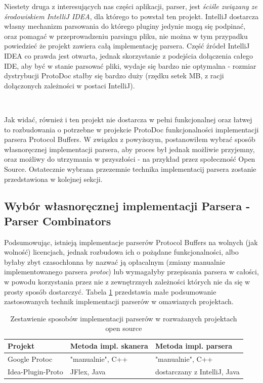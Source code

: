 \documentclass[pdflatex,11pt]{aghdpl}
\begin{document}
\newpage

Niestety druga z interesujących nas części aplikacji, parser, jest \textit{ściśle związany ze środowiskiem IntelliJ IDEA}, dla którego to powstał ten projekt.
IntelliJ dostarcza własny mechanizm parsowania do którego pluginy jedynie mogą się podpinać, oraz pomagać w przeprowadzeniu parsingu pliku, nie można w tym przypadku
powiedzieć że projekt zawiera całą implementację parsera. Część źródeł IntelliJ IDEA co prawda jest otwarta, jednak skorzystanie z podejścia dołączenia całego IDE,
aby być w stanie parsować pliki, wydaje się bardzo nie optymalna - rozmiar dystrybucji ProtoDoc stałby się bardzo duży (rzędku setek MB, z racji dołączonych 
zależności w postaci IntelliJ).

~\\\*

Jak widać, również i ten projekt nie dostarcza w pełni funkcjonalnej oraz łatwej to rozbudowania o potrzebne w projekcie ProtoDoc funkcjonalności implementacji parsera
Protocol Buffers. W związku z powyższym, postanowiłem wybrać sposób własnoręcznej implementacji parsera, aby proces był jednak możliwie przyjemny, oraz
możliwy do utrzymania w przyszłości - na przykład przez społeczność Open Source. Ostatecznie wybrana przezemnie technika implementacij parsera 
zostanie przedstawiona w kolejnej sekcji.



\subsection{Wybór własnoręcznej implementacji Parsera - Parser Combinators}
\label{sec:wybor_parsera}

Podsumowując, istnieją implementacje parserów Protocol Buffers na wolnych (jak wolność) licencjach, jednak rozbudowa ich o pożądane funkcjonalności,
albo byłaby zbyt czasochłonna by nazwać ją opłacalnym (zmiany manualnie implementowanego parsera \textit{protoc}) lub wymagałyby 
przepisania parsera w całości, w powodu korzystania przez nie z zewnętrznych zależności których nie da się w prosty sposób dostarczyć.
Tabela \ref{tab:parers} przedstawia małe podsumowanie zastosowanych technik implementacji parserów w omawianych projektach.

\begin{table}[ch]
  \begin{center}
    \begin{tabular}{| l | l | l |}
      \hline
      Projekt & Metoda impl. skanera & Metoda impl. parsera\\
      \hline
      Google Protoc & "manualnie", C++ & "manualnie", C++\\
      \hline
      Idea-Plugin-Proto & JFlex, Java & dostarczany z IntelliJ, Java\\
      \hline
    \end{tabular}
    \caption{Zestawienie sposobów implementacji parserów w rozważanych projektach open source}
  \end{center}
  \label{tab:parers}
\end{table}
\end{document}
